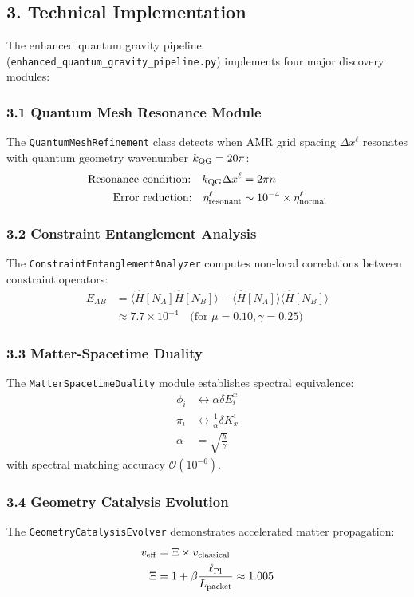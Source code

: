 \documentclass[12pt]{article}
\begin{document}
\subsection*{3. Technical Implementation}
The enhanced quantum gravity pipeline (\texttt{enhanced\_quantum\_gravity\_pipeline.py}) implements four major discovery modules:

\subsubsection*{3.1 Quantum Mesh Resonance Module}
The \texttt{QuantumMeshRefinement} class detects when AMR grid spacing $\Delta x^\ell$ resonates with quantum geometry wavenumber $k_{\rm QG} = 20\pi$:
\begin{align}
  \text{Resonance condition:} \quad k_{\rm QG} \Delta x^\ell &= 2\pi n \\
  \text{Error reduction:} \quad \eta^\ell_{\rm resonant} &\sim 10^{-4} \times \eta^\ell_{\rm normal}
\end{align}

\subsubsection*{3.2 Constraint Entanglement Analysis}
The \texttt{ConstraintEntanglementAnalyzer} computes non-local correlations between constraint operators:
\begin{align}
  E_{AB} &= \langle \hat{H}[N_A] \hat{H}[N_B] \rangle - \langle \hat{H}[N_A] \rangle \langle \hat{H}[N_B] \rangle \\
  &\approx 7.7 \times 10^{-4} \quad \text{(for } \mu = 0.10, \gamma = 0.25\text{)}
\end{align}

\subsubsection*{3.3 Matter-Spacetime Duality}
The \texttt{MatterSpacetimeDuality} module establishes spectral equivalence:
\begin{align}
  \phi_i &\leftrightarrow \alpha \delta E^x_i \\
  \pi_i &\leftrightarrow \frac{1}{\alpha} \delta K_x^i \\
  \alpha &= \sqrt{\frac{\hbar}{\gamma}}
\end{align}
with spectral matching accuracy $\mathcal{O}(10^{-6})$.

\subsubsection*{3.4 Geometry Catalysis Evolution}
The \texttt{GeometryCatalysisEvolver} demonstrates accelerated matter propagation:
\begin{align}
  v_{\rm eff} &= \Xi \times v_{\rm classical} \\
  \Xi &= 1 + \beta \frac{\ell_{\rm Pl}}{L_{\rm packet}} \approx 1.005
\end{align}
\end{document}
